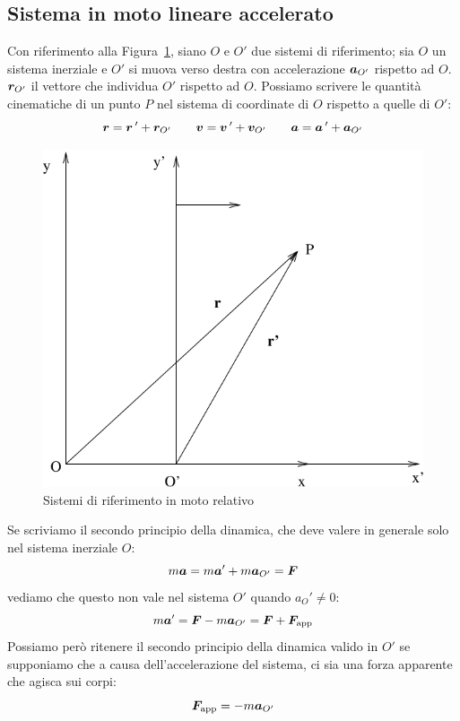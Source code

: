 \subsection{Sistema in moto lineare accelerato}
Con riferimento alla Figura~\ref{fig:forze_apparenti}, siano $O$ e $O'$ due sistemi di riferimento; sia $O$ un sistema inerziale e $O'$ si muova verso destra con accelerazione $\boldsymbol{a}_{O'}$ rispetto ad $O$. $\boldsymbol{r}_{O'}$ il vettore che individua $O'$ rispetto ad $O$. Possiamo scrivere le quantità cinematiche di un punto $P$ nel sistema di coordinate di $O$ rispetto a quelle di $O'$:
\[\boldsymbol{r}={\boldsymbol{r}}\,^\prime+\boldsymbol{r}_{O'}\qquad\boldsymbol{v}=\boldsymbol{v}\,'+\boldsymbol{v}_{O'}\qquad\boldsymbol{a}=\boldsymbol{a}\,'+\boldsymbol{a}_{O'}\]
\begin{figure}[tbp]
  \centering
  \includegraphics[scale=0.5]{immagini/fisica1/apparenti}
  \caption{Sistemi di riferimento in moto relativo}
  \label{fig:forze_apparenti}
\end{figure}
Se scriviamo il secondo principio della dinamica, che deve valere in generale solo nel sistema inerziale $O$:
\[m\boldsymbol{a}=m\boldsymbol{a}'+m\boldsymbol{a}_{O'}=\boldsymbol{F}\]
vediamo che questo non vale nel sistema $O'$ quando $a_O'\neq 0$:
\[m\boldsymbol{a}'=\boldsymbol{F}-m\boldsymbol{a}_{O'}=\boldsymbol{F}+\boldsymbol{F}_\text{app}\]
Possiamo però ritenere il secondo principio della dinamica valido in $O'$ se supponiamo che a causa dell'accelerazione del sistema, ci sia una forza apparente che agisca sui corpi:
\[\boldsymbol{F}_\text{app}=-m\boldsymbol{a}_{O'}\]
